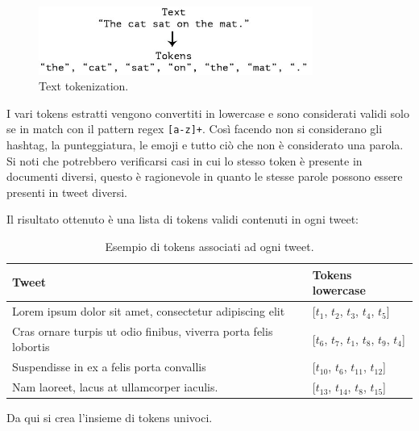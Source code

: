 \documentclass[oneside]{book}
\begin{document}
\begin{figure}[!h]
	\centering
	\includegraphics[width=9cm]{assets/text-to-tokens.jpg}
	\caption{Text tokenization.}
	\label{fig:tokenization}
\end{figure}


\pagebreak

I vari tokens estratti vengono convertiti in lowercase e sono considerati validi solo se in match con il pattern regex \texttt{[a-z]+}. Così facendo non si considerano gli hashtag, la punteggiatura, le emoji e tutto ciò che non è considerato una parola. Si noti che potrebbero verificarsi casi in cui lo stesso token è presente in documenti diversi, questo è ragionevole in quanto le stesse parole possono essere presenti in tweet diversi.


Il risultato ottenuto è una lista di tokens validi contenuti in ogni tweet:

\begin{table}[h!]
	\centering
	\begin{tabular}[t]{l|l}
		\hline
		\textbf{Tweet} & \textbf{Tokens lowercase}\\
		\hline
		Lorem ipsum dolor sit amet, consectetur adipiscing elit				& [$t_1$, $t_2$, $t_3$, $t_4$, $t_5$] \\
		Cras ornare turpis ut odio finibus, viverra porta felis lobortis 	& [$t_6$, $t_7$, $t_1$, $t_8$, $t_9$, $t_4$] \\
		Suspendisse in ex a felis porta convallis							& [$t_{10}$, $t_6$, $t_{11}$, $t_{12}$] \\
		Nam laoreet, lacus at ullamcorper iaculis.							& [$t_{13}$, $t_{14}$, $t_8$, $t_{15}$]\\
		
		\hline
	\end{tabular}
	\caption{Esempio di tokens associati ad ogni tweet.}
\end{table}

Da qui si crea l'insieme di tokens univoci.
\end{document}
